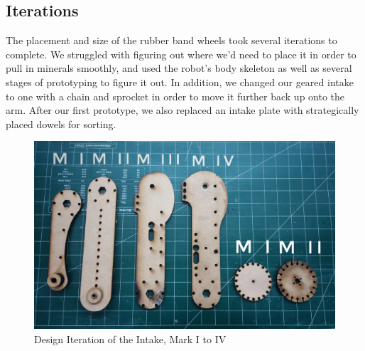 \subsection*{Iterations}
The placement and size of the rubber band wheels took several iterations to complete. We struggled with figuring out where we'd need to place it in order to pull in minerals smoothly, and used the robot's body skeleton as well as several stages of prototyping to figure it out. In addition, we changed our geared intake to one with a chain and sprocket in order to move it further back up onto the arm. After our first prototype, we also replaced an intake plate with strategically placed dowels for sorting. 


\begin{figure}[htp]
\centering
\includegraphics[width=.8\linewidth]{Design_Overview/Intake_Iteration.jpg}
\caption{Design Iteration of the Intake, Mark I to IV}
\label{fig:intake_it}
\end{figure}

